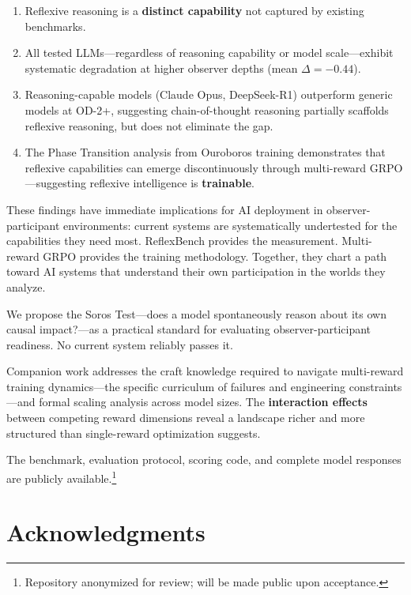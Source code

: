 \documentclass{article}
\begin{document}
\begin{enumerate}[leftmargin=*]
\item Reflexive reasoning is a \textbf{distinct capability} not captured by existing benchmarks.
\item All tested LLMs---regardless of reasoning capability or model scale---exhibit systematic degradation at higher observer depths (mean $\Delta = -0.44$).
\item Reasoning-capable models (Claude Opus, DeepSeek-R1) outperform generic models at OD-2+, suggesting chain-of-thought reasoning partially scaffolds reflexive reasoning, but does not eliminate the gap.
\item The Phase Transition analysis from Ouroboros training demonstrates that reflexive capabilities can emerge discontinuously through multi-reward GRPO---suggesting reflexive intelligence is \textbf{trainable}.
\end{enumerate}

These findings have immediate implications for AI deployment in observer-participant environments: current systems are systematically undertested for the capabilities they need most. ReflexBench provides the measurement. Multi-reward GRPO provides the training methodology. Together, they chart a path toward AI systems that understand their own participation in the worlds they analyze.

We propose the Soros Test---does a model spontaneously reason about its own causal impact?---as a practical standard for evaluating observer-participant readiness. No current system reliably passes it.

Companion work addresses the craft knowledge required to navigate multi-reward training dynamics---the specific curriculum of failures and engineering constraints---and formal scaling analysis across model sizes. The \textbf{interaction effects} between competing reward dimensions reveal a landscape richer and more structured than single-reward optimization suggests.

The benchmark, evaluation protocol, scoring code, and complete model responses are publicly available.\footnote{Repository anonymized for review; will be made public upon acceptance.}

\section*{Acknowledgments}
\end{document}
